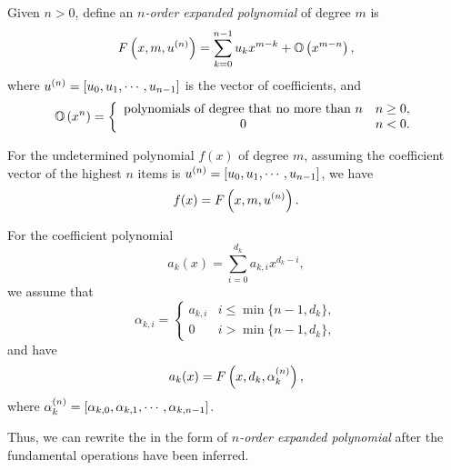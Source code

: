 Given $n>0$, define an \emph{$n$-order expanded polynomial} of degree $m$ is
\begin{equation}
F\left(x,m,u^{(n)}\right)=\sum_{k=0}^{n-1}{u_k x^{m-k}}+\mathbb O\left(x^{m-n}\right),
\label{npoly}
\end{equation}
where $u^{(n)}=\left[u_0,u_1,\cdots,u_{n-1}\right]$ is the vector of coefficients, and
\begin{equation}
\mathbb O\left(x^n\right)=\left\{
\begin{array}{cl}
\text{polynomials of degree that no more than } n & n\ge 0, \\
0                                                 & n<0 .
\end{array}
\right.
\end{equation}

For the undetermined polynomial $f(x)$ of degree $m$, assuming the coefficient vector of the highest $n$ items is $u^{(n)}=\left[u_0,u_1,\cdots,u_{n-1}\right]$, we have
\begin{equation}
f(x)=F\left(x,m,u^{(n)}\right).
\end{equation}

For the coefficient polynomial
\begin{equation}
a_k(x)=\sum_{i=0}^{d_k}{a_{k,i} x^{d_k-i}},
\end{equation}
we assume that
\begin{equation}
\alpha_{k,i}=\left\{
\begin{array}{cl}
a_{k,i} & i\le \min\{n-1,d_k\}, \\
0       & i >  \min\{n-1,d_k\},
\end{array}
\right.
\end{equation}
and have
\begin{equation}
a_k(x)=F\left(x,d_k,\alpha_k^{(n)}\right),
\end{equation}
where $\alpha_k^{(n)}=\left[\alpha_{k,0},\alpha_{k,1},\cdots,\alpha_{k,n-1}\right]$.

Thus, we can rewrite the  in the form of \emph{$n$-order expanded polynomial} after the fundamental operations have been inferred.

